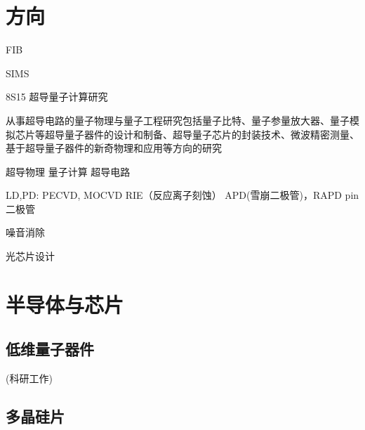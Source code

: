  
\usepackage[a4paper,left=15mm,right=15mm,top=15mm,bottom=15mm]{geometry} %


	
\newpage
	
	\renewcommand{\contentsname}{目录}  %
	\tableofcontents\label{目录}

\section{方向}
FIB

SIMS




8S15 超导量子计算研究

从事超导电路的量子物理与量子工程研究包括量子比特、量子参量放大器、量子模拟芯片等超导量子器件的设计和制备、超导量子芯片的封装技术、微波精密测量、基于超导量子器件的新奇物理和应用等方向的研究

超导物理
量子计算
超导电路

LD,PD:
PECVD, MOCVD
RIE（反应离子刻蚀）
APD(雪崩二极管)，RAPD
pin二极管

噪音消除

光芯片设计

\section{半导体与芯片}

\subsection{低维量子器件}
(科研工作) 

\subsection{多晶硅片}


